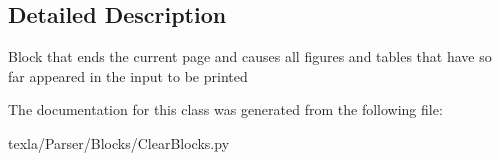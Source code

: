 \subsection{Detailed Description}
\begin{DoxyVerb}Block that  ends the current page
and causes all figures and tables that
have so far appeared in the input to be printed\end{DoxyVerb}
 

The documentation for this class was generated from the following file\+:\begin{DoxyCompactItemize}
\item 
texla/\+Parser/\+Blocks/Clear\+Blocks.\+py\end{DoxyCompactItemize}
